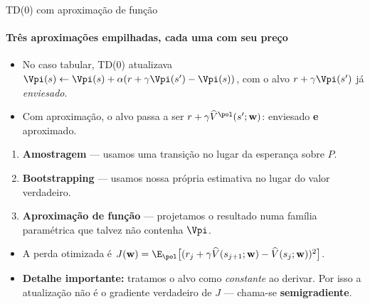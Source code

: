 \documentclass[aspectratio=169, 11pt]{beamer}
\newcommand{\Vhat}{\widehat{V}}
\newcommand{\wv}{\mathbf{w}}
\begin{document}
\begin{frame}{TD(0) com aproximação de função}
  \framesubtitle{Três aproximações empilhadas, cada uma com seu preço}

  \begin{itemize}\setlength{\itemsep}{0.3ex}
    \item No caso tabular, TD(0) atualizava
      $\Vpi(s) \leftarrow \Vpi(s) + \alpha(r + \gamma \Vpi(s') - \Vpi(s))$,
      com o alvo $r + \gamma\Vpi(s')$ já \emph{enviesado}.
    \item Com aproximação, o alvo passa a ser
      $r + \gamma\Vhat^{\pol}(s';\wv)$: enviesado \textbf{e} aproximado.
  \end{itemize}

  \begin{alertabox}
    \begin{enumerate}\setlength{\itemsep}{0.2ex}
      \item \textbf{Amostragem} --- usamos uma transição no lugar da
        esperança sobre $P$.
      \item \textbf{Bootstrapping} --- usamos nossa própria estimativa no
        lugar do valor verdadeiro.
      \item \textbf{Aproximação de função} --- projetamos o resultado numa
        família paramétrica que talvez não contenha $\Vpi$.
    \end{enumerate}
  \end{alertabox}

  \vspace{-0.3em}
  \begin{itemize}\setlength{\itemsep}{0.3ex}
    \item A perda otimizada é
      $J(\wv) = \E_{\pol}\bigl[(r_j + \gamma\Vhat(s_{j+1};\wv) - \Vhat(s_j;\wv))^2\bigr]$.
    \item \textbf{Detalhe importante:} tratamos o alvo como \emph{constante}
      ao derivar. Por isso a atualização não é o gradiente verdadeiro de
      $J$ --- chama-se \textbf{semigradiente}.
  \end{itemize}
\end{frame}
\end{document}
